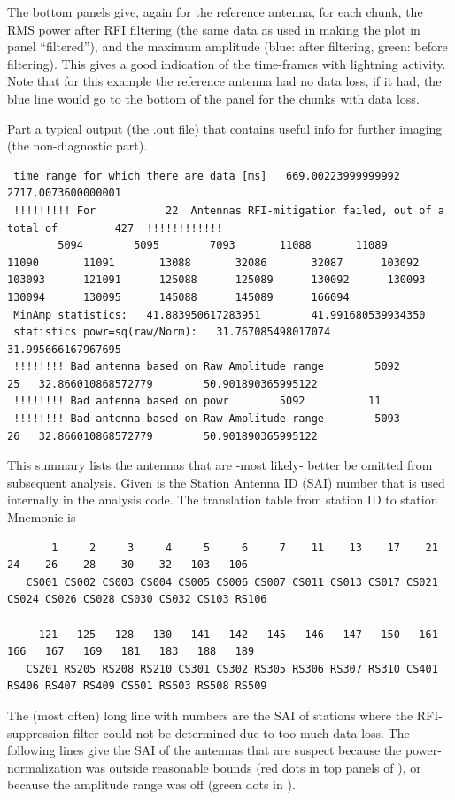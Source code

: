 The bottom panels give, again for the reference antenna, for each chunk, the RMS power after RFI filtering (the same data as used in making the plot in panel ``filtered''), and the maximum amplitude (blue: after filtering, green: before filtering). This gives a good indication of the time-frames with lightning activity. Note that for this example the reference antenna had no data loss, if it had, the blue line would go to the bottom of the panel for the chunks with data loss.

Part a typical output (the .out file) that contains useful info for further imaging (the non-diagnostic part).

\begin{linenumbers}
\tiny
\resetlinenumber
\begin{verbatim}
 time range for which there are data [ms]   669.00223999999992        2717.0073600000001
 !!!!!!!!! For           22  Antennas RFI-mitigation failed, out of a total of         427  !!!!!!!!!!!!
        5094        5095        7093       11088       11089       11090       11091       13088       32086       32087      103092      103093      121091      125088      125089      130092      130093      130094      130095      145088      145089      166094
 MinAmp statistics:   41.883950617283951        41.991680539934350
 statistics powr=sq(raw/Norm):   31.767085498017074        31.995666167967695
 !!!!!!!! Bad antenna based on Raw Amplitude range        5092          25   32.866010868572779        50.901890365995122
 !!!!!!!! Bad antenna based on powr        5092          11
 !!!!!!!! Bad antenna based on Raw Amplitude range        5093          26   32.866010868572779        50.901890365995122
\end{verbatim}
\end{linenumbers}

This summary lists the antennas that are -most likely- better be omitted from subsequent analysis. Given is the Station Antenna ID (SAI) number that is used internally in the analysis code. The translation table from station ID to station Mnemonic is
{
\tiny
\begin{verbatim}
       1     2     3     4     5     6     7    11    13    17    21    24    26    28    30    32   103   106
   CS001 CS002 CS003 CS004 CS005 CS006 CS007 CS011 CS013 CS017 CS021 CS024 CS026 CS028 CS030 CS032 CS103 RS106

     121   125   128   130   141   142   145   146   147   150   161   166   167   169   181   183   188   189
   CS201 RS205 RS208 RS210 CS301 CS302 RS305 RS306 RS307 RS310 CS401 RS406 RS407 RS409 CS501 RS503 RS508 RS509
\end{verbatim}
}
The (most often) long line with numbers are the SAI of stations where the RFI-suppression filter could not be determined due to too much data loss. The following lines give the SAI of the antennas that are suspect because the power-normalization was outside reasonable bounds (red dots in top panels of ), or because the amplitude range was off (green dots in ).

